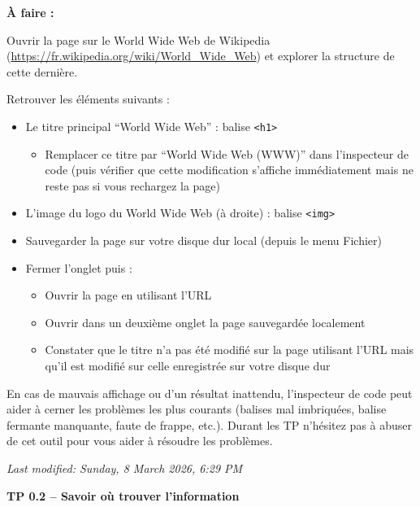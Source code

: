 \documentclass[11pt]{article}
\begin{document}
\begin{afaire}
\textbf{À faire :}

Ouvrir la page sur le World Wide Web de Wikipedia (\url{https://fr.wikipedia.org/wiki/World_Wide_Web}) et explorer la structure de cette dernière.

Retrouver les éléments suivants :

\begin{itemize}
    \item Le titre principal ``World Wide Web'' : balise \texttt{<h1>}
    \begin{itemize}
        \item Remplacer ce titre par ``World Wide Web (WWW)'' dans l'inspecteur de code (puis vérifier que cette modification s'affiche immédiatement mais ne reste pas si vous rechargez la page)
    \end{itemize}
    \item L'image du logo du World Wide Web (à droite) : balise \texttt{<img>}
    \item Sauvegarder la page sur votre disque dur local (depuis le menu Fichier)
    \item Fermer l'onglet puis :
    \begin{itemize}
        \item Ouvrir la page en utilisant l'URL
        \item Ouvrir dans un deuxième onglet la page sauvegardée localement
        \item Constater que le titre n'a pas été modifié sur la page utilisant l'URL mais qu'il est modifié sur celle enregistrée sur votre disque dur
    \end{itemize}
\end{itemize}
\end{afaire}

En cas de mauvais affichage ou d'un résultat inattendu, l'inspecteur de code peut aider à cerner les problèmes les plus courants (balises mal imbriquées, balise fermante manquante, faute de frappe, etc.). Durant les TP n'hésitez pas à abuser de cet outil pour vous aider à résoudre les problèmes.

\vspace{1em}
\noindent\textit{Last modified: Sunday, 8 March 2026, 6:29 PM}

\newpage
{}

{\Large\bfseries TP 0.2 -- Savoir où trouver l'information}
\end{document}
